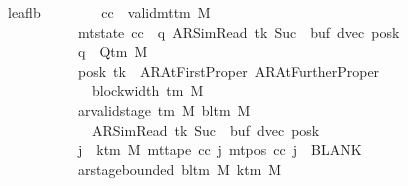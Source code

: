 \begin{isabellebody}
\ \ \ \ \ \ \ leaf{\isacharunderscore}{\kern0pt}lb{}{\isacharcolon}{\kern0pt}\isanewline
\ \ \ \ \ \ \ \ {\isachardoublequoteopen}{\isasymAnd}cc{\isachardot}{\kern0pt}\ {\isasymlbrakk}\ valid{\isacharunderscore}{\kern0pt}mttm\ M{\isacharsemicolon}{\kern0pt}\isanewline
\ \ \ \ \ \ \ \ \ \ \ \ \ \ \ \ \ mt{\isacharunderscore}{\kern0pt}state\ cc\ {\isacharequal}{\kern0pt}\ {\isacharparenleft}{\kern0pt}q{\isacharcomma}{\kern0pt}\ AR{\isacharunderscore}{\kern0pt}SimRead{\isacharcomma}{\kern0pt}\ tk{\isacharcomma}{\kern0pt}\ Suc\ {}{\isacharcomma}{\kern0pt}\ buf{\isacharcomma}{\kern0pt}\ dvec{\isacharcomma}{\kern0pt}\ posk{\isacharparenright}{\kern0pt}{\isacharsemicolon}{\kern0pt}\isanewline
\ \ \ \ \ \ \ \ \ \ \ \ \ \ \ \ \ q\ {\isasymin}\ Q{\isacharunderscore}{\kern0pt}tm\ M{\isacharsemicolon}{\kern0pt}\isanewline
\ \ \ \ \ \ \ \ \ \ \ \ \ \ \ \ \ posk\ tk\ {\isasymin}\ {\isacharbraceleft}{\kern0pt}AR{\isacharunderscore}{\kern0pt}AtFirstProper{\isacharcomma}{\kern0pt}\ AR{\isacharunderscore}{\kern0pt}AtFurtherProper{\isacharbraceright}{\kern0pt}{\isacharsemicolon}{\kern0pt}\isanewline
\ \ \ \ \ \ \ \ \ \ \ \ \ \ \ \ \ {}\ {\isasymle}\ block{\isacharunderscore}{\kern0pt}width\ {\isacharparenleft}{\kern0pt}{\isasymGamma}{\isacharunderscore}{\kern0pt}tm\ M{\isacharparenright}{\kern0pt}{\isacharsemicolon}{\kern0pt}\isanewline
\ \ \ \ \ \ \ \ \ \ \ \ \ \ \ \ \ ar{\isacharunderscore}{\kern0pt}valid{\isacharunderscore}{\kern0pt}stage\ {\isacharparenleft}{\kern0pt}{\isasymGamma}{\isacharunderscore}{\kern0pt}tm\ M{\isacharparenright}{\kern0pt}\ {\isacharparenleft}{\kern0pt}bl{\isacharunderscore}{\kern0pt}tm\ M{\isacharparenright}{\kern0pt}\isanewline
\ \ \ \ \ \ \ \ \ \ \ \ \ \ \ \ \ \ \ {\isacharparenleft}{\kern0pt}AR{\isacharunderscore}{\kern0pt}SimRead{\isacharcomma}{\kern0pt}\ tk{\isacharcomma}{\kern0pt}\ Suc\ {}{\isacharcomma}{\kern0pt}\ buf{\isacharcomma}{\kern0pt}\ dvec{\isacharcomma}{\kern0pt}\ posk{\isacharparenright}{\kern0pt}{\isacharsemicolon}{\kern0pt}\isanewline
\ \ \ \ \ \ \ \ \ \ \ \ \ \ \ \ \ {\isasymforall}j\ {\isasymge}\ k{\isacharunderscore}{\kern0pt}tm\ M{\isachardot}{\kern0pt}\ mt{\isacharunderscore}{\kern0pt}tape\ cc\ j\ {\isacharparenleft}{\kern0pt}mt{\isacharunderscore}{\kern0pt}pos\ cc\ j{\isacharparenright}{\kern0pt}\ {\isacharequal}{\kern0pt}\ BLANK{}{\isacharsemicolon}{\kern0pt}\isanewline
\ \ \ \ \ \ \ \ \ \ \ \ \ \ \ \ \ ar{\isacharunderscore}{\kern0pt}stage{\isacharunderscore}{\kern0pt}bounded\ {\isacharparenleft}{\kern0pt}bl{\isacharunderscore}{\kern0pt}tm\ M{\isacharparenright}{\kern0pt}\ {\isacharparenleft}{\kern0pt}k{\isacharunderscore}{\kern0pt}tm\ M{\isacharparenright}{\kern0pt}\isanewline

\end{isabellebody}
